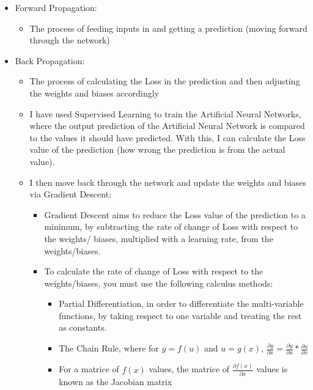 \documentclass[./project-report/src/latex/project-report.tex]{subfiles}
\begin{document}
\begin{itemize}
    \item Forward Propagation:

    \begin{itemize}
        \item The process of feeding inputs in and getting a prediction (moving forward through the network)
    \end{itemize}

    \item Back Propagation:

    \begin{itemize}
        \item The process of calculating the Loss in the prediction and then adjusting the weights and biases accordingly
        \item I have used Supervised Learning to train the Artificial Neural Networks, where the output prediction of the Artificial Neural Network is compared to the 
              values it should have predicted. With this, I can calculate the Loss value of the prediction (how wrong the prediction is from the actual value).
        \item I then move back through the network and update the weights and biases via Gradient Descent:
        \begin{itemize}
            \item Gradient Descent aims to reduce the Loss value of the prediction to a minimum, by subtracting the rate of change of Loss with respect to the weights/
                  biases, multiplied with a learning rate, from the weights/biases.
            \item To calculate the rate of change of Loss with respect to the weights/biases, you must use the following calculus methods:
            \begin{itemize}
                \item Partial Differentiation, in order to differentiate the multi-variable functions, by taking respect to one variable and treating the rest as 
                      constants.
                \item The Chain Rule, where for $y = f(u)$ and $u = g(x)$, 
                      $\frac{\partial{y}}{\partial{x}} = \frac{\partial{y}}{\partial{u}} * \frac{\partial{u}}{\partial{x}}$
                \item For a matrice of $f(x)$ values, the matrice of $\frac{\partial{f(x)}}{\partial{x}}$ values is known as the Jacobian matrix
            \end{itemize}

\end{itemize}
\end{itemize}
\end{itemize}
\end{document}

